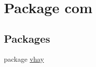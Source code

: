 \hypertarget{namespacecom}{}\section{Package com}
\label{namespacecom}
\subsection*{Packages}
\begin{DoxyCompactItemize}
\item 
package \mbox{\hyperlink{namespacecom_1_1vhay}{vhay}}
\end{DoxyCompactItemize}
